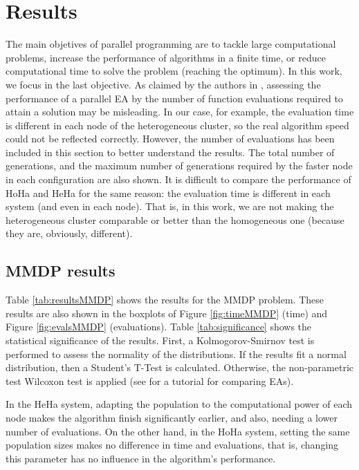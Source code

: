 \documentclass[final,1p,times]{elsarticle}
\begin{document}

\section{Results}
\label{sec:results}

The main objetives of parallel programming are to tackle large computational problems, increase the performance of algorithms in a finite time, or reduce computational time to solve the problem (reaching the optimum). In this work, we focus in the last objective.
As claimed by the authors in \cite{EVALUATIONPARALLEL}, assessing the performance of a parallel EA by the number of function evaluations required to attain a solution may be misleading. In our case, for example, the evaluation time is different in each node of the heterogeneous cluster, so the real algorithm speed could not be reflected correctly. However, the number of evaluations has been included in this section to better understand the results. The total number of generations, and the maximum number of generations required by the faster node in each configuration are also shown. It is difficult to compare the performance of HoHa and HeHa for the same reason: the evaluation time is different in each system (and even in each node). That is, in this work, we are not making the heterogeneous cluster comparable or better than the homogeneous one (because they are, obviously, different).

\subsection{MMDP results}

Table \ref{tab:resultsMMDP} shows the results for the MMDP problem. These results are also shown in the boxplots of Figure \ref{fig:timeMMDP} (time) and Figure \ref{fig:evalsMMDP} (evaluations). Table \ref{tab:significance} shows the statistical significance of the results. First, a Kolmogorov-Smirnov test is performed to assess the normality of the distributions. If the results fit a normal distribution, then a Student's T-Test is calculated. Otherwise, the non-parametric test Wilcoxon test is applied (see \cite{TUTORIAL} for a tutorial for comparing EAs).

 In the HeHa system, adapting the population to the computational
 power of each node makes the algorithm finish significantly earlier,
 and also, needing a lower number of evaluations. On the other hand, in the HoHa system,
 setting the same population sizes makes no difference in time and
 evaluations, that is, changing this parameter has no influence in the
 algorithm's performance.  
\end{document}
